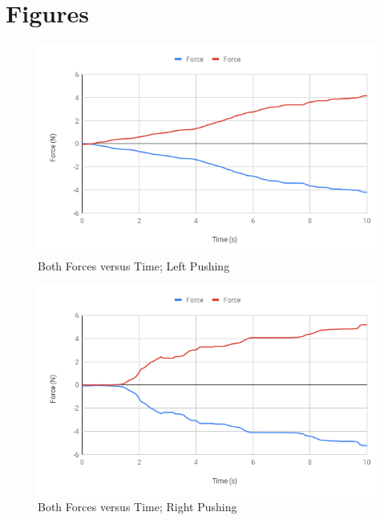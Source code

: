 \section{Figures}
%
\begin{figure}[ht]
    \centering
    \includegraphics[scale=0.71]{image/05-third-law/Run-13-Both.png}
    \caption{Both Forces versus Time; Left Pushing}
    \label{figure:05.ff.L}
\end{figure}
%
\begin{figure}[ht]
    \centering
    \includegraphics[scale=0.71]{image/05-third-law/Run-14-Both.png}
    \caption{Both Forces versus Time; Right Pushing}
    \label{figure:05.ff.R}
\end{figure}
%
